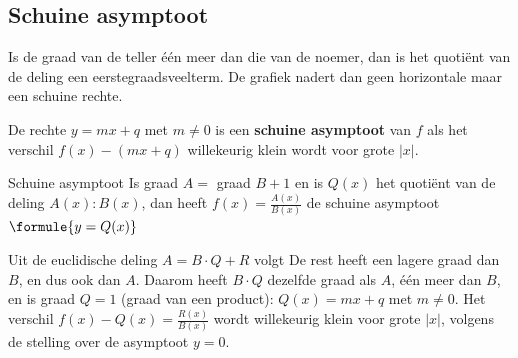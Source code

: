 \subsection{Schuine asymptoot}

Is de graad van de teller één meer dan die van de noemer, dan is het quotiënt van de deling een eerstegraadsveelterm. De grafiek nadert dan geen horizontale maar een schuine rechte.

\begin{theorie}
De rechte $y = mx + q$ met $m \neq 0$ is een \textbf{\textcolor{accent}{schuine asymptoot}} van $f$ als het verschil $f(x) - (mx + q)$ willekeurig klein wordt voor grote $|x|$.

\begin{stelling}{Schuine asymptoot}
Is graad $A =$ graad $B + 1$ en is $Q(x)$ het quotiënt van de deling $A(x) : B(x)$, dan heeft $f(x) = \frac{A(x)}{B(x)}$ de schuine asymptoot \quad $\formule{y = Q(x)}$
\end{stelling}

\begin{bewijs}
Uit de euclidische deling $A = B \cdot Q + R$ volgt
De rest heeft een lagere graad dan $B$, en dus ook dan $A$. Daarom heeft $B \cdot Q$ dezelfde graad als $A$, één meer dan $B$, en is graad $Q = 1$ (graad van een product): $Q(x) = mx + q$ met $m \neq 0$. Het verschil $f(x) - Q(x) = \frac{R(x)}{B(x)}$ wordt willekeurig klein voor grote $|x|$, volgens de stelling over de asymptoot $y = 0$.
\end{bewijs}
\end{theorie}



